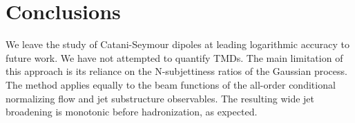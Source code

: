 \section{Conclusions}\label{sec:conclusions}

We leave the study of Catani-Seymour dipoles at leading logarithmic
accuracy to future work. We have not attempted to quantify TMDs. The
main limitation of this approach is its reliance on the N-subjettiness
ratios of the Gaussian process. The method applies equally to the beam
functions of the all-order conditional normalizing flow and jet
substructure observables. The resulting wide jet broadening is monotonic
before hadronization, as expected.

